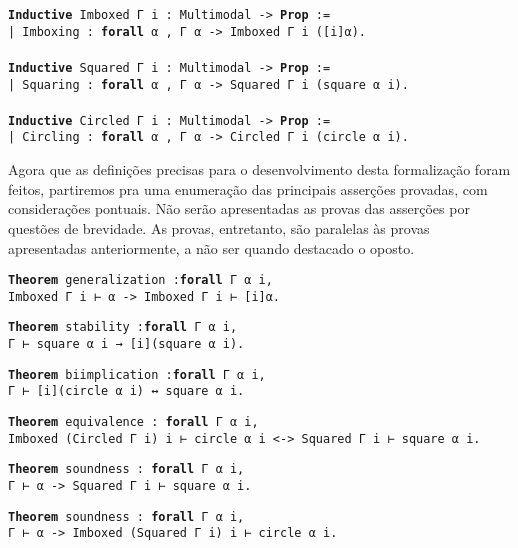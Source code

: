 \begin{mdframed}
\noindent
\texttt
{\noindent\footnotesize\textbf{Inductive} Imboxed Γ i : Multimodal -> \textbf{Prop} :=\\
| Imboxing : \textbf{forall} α , Γ α  -> Imboxed Γ i ([i]α).
\\
\\
\textbf{Inductive} Squared Γ i : Multimodal -> \textbf{Prop} :=\\
| Squaring : \textbf{forall} α , Γ α  -> Squared Γ i (square α i).
\\
\\
\textbf{Inductive} Circled Γ i : Multimodal -> \textbf{Prop} :=\\
| Circling : \textbf{forall} α , Γ α  -> Circled Γ i (circle α i).
}
\end{mdframed}
\hfill\break
Agora que as definições precisas para o desenvolvimento desta formalização foram feitos, partiremos pra uma enumeração das principais asserções provadas, com considerações pontuais.
Não serão apresentadas as provas das asserções por questões de brevidade.
As provas, entretanto, são paralelas às provas apresentadas anteriormente, a não ser quando destacado o oposto.
\hfill\break
\begin{mdframed}
\texttt{\noindent\footnotesize\textbf{Theorem} generalization :\textbf{forall} Γ α i,\\Imboxed Γ i ⊢ α -> Imboxed Γ i ⊢ [i]α.}
\end{mdframed}

\begin{mdframed}
\texttt{\noindent\footnotesize\textbf{Theorem} stability :\textbf{forall} Γ α i,\\Γ ⊢ square α i → [i](square α i).}
\end{mdframed}

\begin{mdframed}
\texttt{\noindent\footnotesize\textbf{Theorem} biimplication :\textbf{forall} Γ α i,\\Γ ⊢ [i](circle α i) ↔ square α i.}
\end{mdframed}

\begin{mdframed}
\texttt{\noindent\footnotesize\textbf{Theorem} equivalence : \textbf{forall} Γ α i,\\Imboxed (Circled Γ i) i ⊢ circle α i <-> Squared Γ i ⊢ square α i.}
\end{mdframed}

\begin{mdframed}
\texttt{\noindent\footnotesize\textbf{Theorem} soundness : \textbf{forall} Γ α i,\\Γ ⊢ α -> Squared Γ i ⊢ square α i.}
\end{mdframed}

\begin{mdframed}
\texttt{\noindent\footnotesize\textbf{Theorem} soundness : \textbf{forall} Γ α i,\\Γ ⊢ α -> Imboxed (Squared Γ i) i ⊢ circle α i.}
\end{mdframed}
